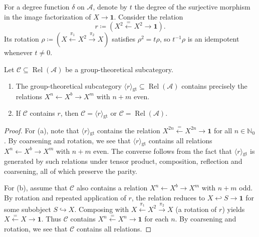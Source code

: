 \documentclass[11pt]{amsart}
\theoremstyle{definition}
\theoremstyle{remark}
\newcommand\cA{\mathcal A}
\newcommand\cC{\mathcal C}
\renewcommand\:\colon
\newcommand\one{\mathbf{1}}
\newcommand\NN{\mathbb N}
\renewcommand\:\colon
\newcommand\Rel{\operatorname{Rel}}
\newcommand\angl[1]{\langle{}#1\rangle{}} %
\newcommand\gtcategory[1]{\angl{#1}_{\mathrm{gt}}}
\begin{document}
For a degree function $\delta$ on $\cA$, denote by $t$ the degree of the surjective morphism in the image factorization of $X \to \one$. Consider the relation
\[
    r \coloneqq \left(X^2 \xleftarrow{=} X^2 \to \one\right).
\]
Its rotation $\rho\coloneqq(X\xleftarrow{\pi_1}X^2\xrightarrow{\pi_2}X)$ satisfies $\rho^2 = t\rho$, so $t^{-1}\rho$ is an idempotent whenever $t \ne 0$.

\begin{lemma} \label{l:r-is-special}
    Let $\cC \subseteq \Rel(\cA)$ be a group-theoretical subcategory.
    \begin{enumerate}
        \item[(a)] The group-theoretical subcategory $\gtcategory{r} \subseteq \Rel(\cA)$ contains precisely the relations $X^n \leftarrow X^b \rightarrow X^m$ with $n + m$ even.
        \item[(b)] If $\cC$ contains $r$, then $\cC = \gtcategory{r}$ or $\cC = \Rel(\cA)$.
    \end{enumerate}
\end{lemma}
\begin{proof}
    For (a), note that $\gtcategory{r}$ contains the relation $X^{2n} \xleftarrow{=} X^{2n} \to \one$ for all $n \in \NN_0$. By coarsening and rotation, we see that $\gtcategory{r}$ contains all relations $X^n \leftarrow X^b \rightarrow X^m$ with $n + m$ even. The converse follows from the fact that $\gtcategory{r}$ is generated by such relations under tensor product, composition, reflection and coarsening, all of which preserve the parity.

    For (b), assume that $\cC$ also contains a relation $X^n \leftarrow X^b \rightarrow X^m$ with $n + m$ odd. By rotation and repeated application of $r$, the relation reduces to $X \hookleftarrow S \to \one$ for some subobject $S \hookrightarrow X$. Composing with $X \xleftarrow{\pi_1} X^2 \xrightarrow{\pi_2} X$ (a rotation of $r$) yields $X \xleftarrow{=} X \to \one$. Thus $\cC$ contains $X^n \xleftarrow{=} X^n \to \one$ for each $n$. By coarsening and rotation, we see that $\cC$ contains all relations.
\end{proof}
\end{document}
